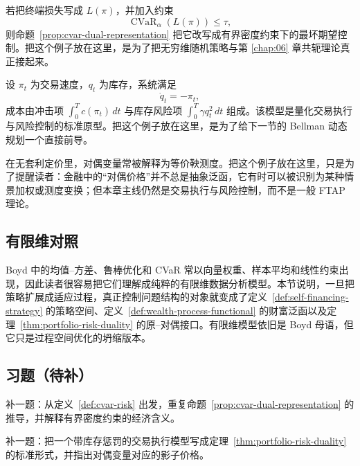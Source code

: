 \begin{example}
若把终端损失写成 $L(\pi)$，并加入约束
\[
\operatorname{CVaR}_\alpha(L(\pi))\le \tau,
\]
则命题~\ref{prop:cvar-dual-representation} 把它改写成有界密度约束下的最坏期望控制。把这个例子放在这里，是为了把无穷维随机策略与第 \ref{chap:06} 章共轭理论真正接起来。
\end{example}

\begin{example}[带交易成本与库存惩罚的执行模型]
设 $\pi_t$ 为交易速度，$q_t$ 为库存，系统满足
\[
\dot q_t=-\pi_t,
\]
成本由冲击项 $\int_0^T c(\pi_t)\,dt$ 与库存风险项 $\int_0^T \gamma q_t^2\,dt$ 组成。该模型是量化交易执行与风险控制的标准原型。把这个例子放在这里，是为了给下一节的 Bellman 动态规划一个直接前导。
\end{example}

\begin{example}[风险中性测度作为背景例子]
在无套利定价里，对偶变量常被解释为等价鞅测度。把这个例子放在这里，只是为了提醒读者：金融中的“对偶价格”并不总是抽象泛函，它有时可以被识别为某种情景加权或测度变换；但本章主线仍然是交易执行与风险控制，而不是一般 FTAP 理论。
\end{example}

\subsection*{有限维对照}

Boyd 中的均值--方差、鲁棒优化和 CVaR 常以向量权重、样本平均和线性约束出现，因此读者很容易把它们理解成纯粹的有限维数据分析模型。本节说明，一旦把策略扩展成适应过程，真正控制问题结构的对象就变成了定义~\ref{def:self-financing-strategy} 的策略空间、定义~\ref{def:wealth-process-functional} 的财富泛函以及定理~\ref{thm:portfolio-risk-duality} 的原--对偶接口。有限维模型依旧是 Boyd 母语，但它只是过程空间优化的坍缩版本。

\subsection*{习题（待补）}

\begin{exercise}
补一题：从定义~\ref{def:cvar-risk} 出发，重复命题~\ref{prop:cvar-dual-representation} 的推导，并解释有界密度约束的经济含义。
\end{exercise}

\begin{exercise}[交易执行桥接题占位]
补一题：把一个带库存惩罚的交易执行模型写成定理~\ref{thm:portfolio-risk-duality} 的标准形式，并指出对偶变量对应的影子价格。
\end{exercise}
